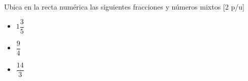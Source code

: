 \documentclass{cli-guia}
\begin{document}
\begin{problemas}
  \problema Ubica en la recta numérica las siguientes fracciones y números mixtos [2 p/u]

  \begin{itemize}[partopsep=0.5cm, itemsep=0.3cm]
    \item $1\dfrac{3}{5}$
    \item $\dfrac{9}{4}$
    \item $\dfrac{14}{3}$
  \end{itemize}


\end{problemas}


\end{document}
